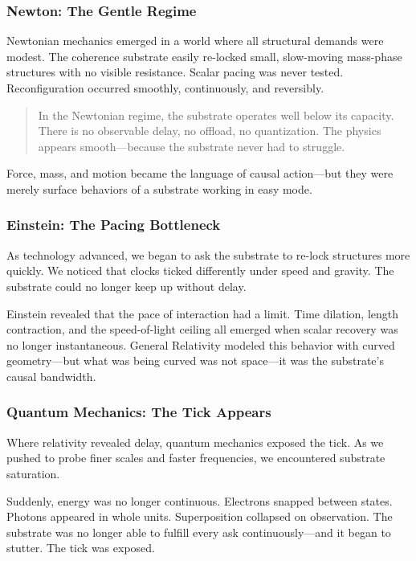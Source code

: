 \documentclass[entropy,article,submit,pdftex,moreauthors]{Definitions/mdpi}
\begin{document}
\subsubsection*{Newton: The Gentle Regime}

Newtonian mechanics emerged in a world where all structural demands were modest. The coherence substrate easily re-locked small, slow-moving mass-phase structures with no visible resistance. Scalar pacing was never tested. Reconfiguration occurred smoothly, continuously, and reversibly.

\begin{quote}
In the Newtonian regime, the substrate operates well below its capacity. There is no observable delay, no offload, no quantization. The physics appears smooth—because the substrate never had to struggle.
\end{quote}

Force, mass, and motion became the language of causal action—but they were merely surface behaviors of a substrate working in easy mode.

\subsubsection*{Einstein: The Pacing Bottleneck}

As technology advanced, we began to ask the substrate to re-lock structures more quickly. We noticed that clocks ticked differently under speed and gravity. The substrate could no longer keep up without delay.

Einstein revealed that the pace of interaction had a limit. Time dilation, length contraction, and the speed-of-light ceiling all emerged when scalar recovery was no longer instantaneous. General Relativity modeled this behavior with curved geometry—but what was being curved was not space—it was the substrate's causal bandwidth.

\subsubsection*{Quantum Mechanics: The Tick Appears}

Where relativity revealed delay, quantum mechanics exposed the tick. As we pushed to probe finer scales and faster frequencies, we encountered substrate saturation.

Suddenly, energy was no longer continuous. Electrons snapped between states. Photons appeared in whole units. Superposition collapsed on observation. The substrate was no longer able to fulfill every ask continuously—and it began to stutter. The tick was exposed.
\end{document}
